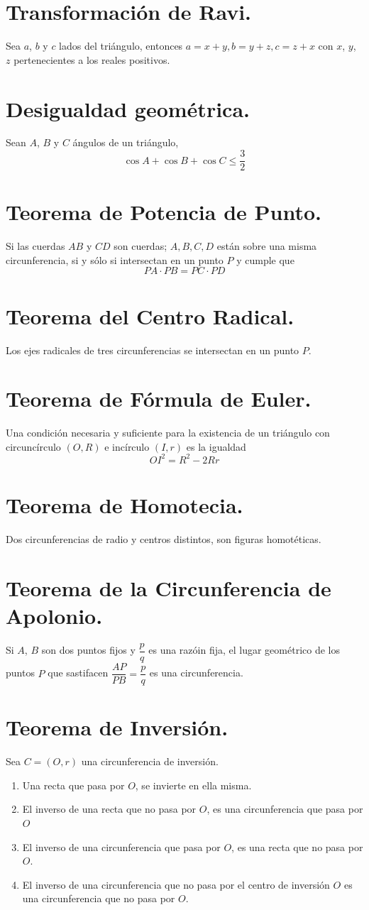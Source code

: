 \documentclass[12pt,a4paper,oneside]{book}
\begin{document}
\section{Transformación de Ravi.}
Sea $a$, $b$ y $c$ lados del triángulo, entonces $a=x+y, b=y+z, c=z+x$ con $x$, $y$, $z$ pertenecientes a los reales positivos.
\section{Desigualdad geométrica.}
Sean $A$, $B$ y $C$ ángulos de un triángulo, $$\cos A +\cos B +\cos C \leq \dfrac{3}{2}$$ 
\section{Teorema de Potencia de Punto.}
Si las cuerdas $AB$ y $CD$ son cuerdas; $A, B, C, D$ están sobre una misma circunferencia, si y sólo si intersectan en un punto $P$ y cumple que $$PA \cdot PB = PC \cdot PD$$
\section{Teorema del Centro Radical.}
Los ejes radicales de tres circunferencias se intersectan en un punto $P$.
\section{Teorema de Fórmula de Euler.}
Una condición necesaria y suficiente para la existencia de un triángulo con circuncírculo $( O, R)$ e incírculo $(I, r)$ es la igualdad $$OI ^2= R^2 - 2Rr$$
\section{Teorema de Homotecia.}
Dos circunferencias de radio  y centros distintos, son figuras homotéticas.
\section{Teorema de la Circunferencia de Apolonio.}
Si $A$, $B$ son dos puntos fijos y $\dfrac{p}{q}$ es una razóin fija, el lugar geométrico de los puntos $P$ que sastifacen $\dfrac{AP}{PB}=\dfrac{p}{q}$ es una circunferencia.
\section{Teorema de Inversión.}
Sea $C=(O, r)$ una circunferencia de inversión. 
\begin{enumerate}
\item Una recta que pasa por $O$, se invierte en ella misma.
\item El inverso de una recta que no pasa por $O$, es una circunferencia que pasa por $O$
\item El inverso de una circunferencia que pasa por $O$, es una recta que no pasa por $O$.
\item El inverso de una circunferencia que no pasa por el centro de inversión $O$ es una circunferencia que no pasa por $O$.
\end{enumerate}
\end{document}
